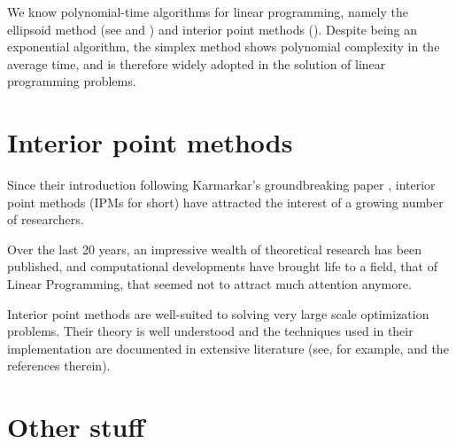 We know polynomial-time algorithms for linear programming, 
namely the ellipsoid method (see \cite[ch.~13]{Schrijver86} 
and \cite[ch.~I.6]{ip:NemhauserWolsey88}) and interior point 
methods (\cite{ipm:Wright97}). Despite being an exponential 
algorithm, the simplex method shows polynomial complexity in 
the average time, and is therefore widely adopted in the 
solution of linear programming problems.


%
%
\section{Interior point methods}

Since their introduction following Karmarkar's groundbreaking paper
\cite{Karmarkar}, interior point methods (IPMs for short) have attracted 
the interest of a growing number of researchers.


Over the last 20 years, an impressive wealth of theoretical research
has been published, and computational developments have brought life
to a field, that of Linear Programming, that seemed not to attract much
attention anymore.


Interior point methods are well-suited to solving very
large scale optimization problems. Their theory is well understood
\cite{ipm:Wright97} and the techniques used in their implementation are
documented in extensive literature (see, for example, 
\cite{AndersenGondzioMeszarosXu,GondzioTerlaky} and the references therein).



%
%
\section{Other stuff}

